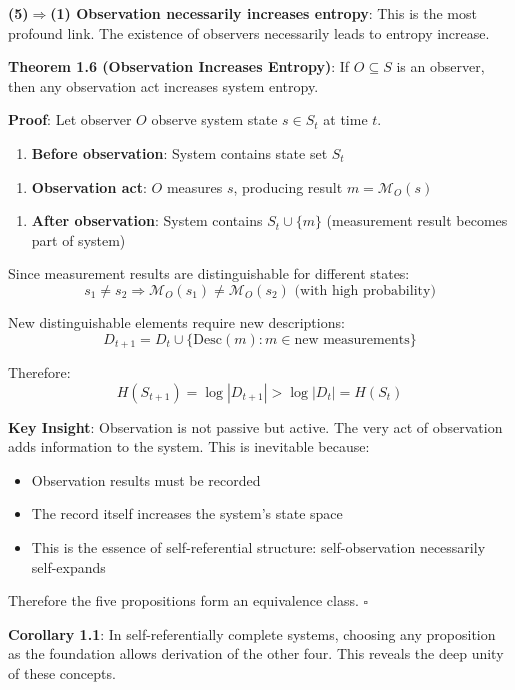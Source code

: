 \textbf{(5)$\Rightarrow$(1) Observation necessarily increases entropy}:
This is the most profound link. The existence of observers necessarily leads to entropy increase.

\textbf{Theorem 1.6 (Observation Increases Entropy)}:
\label{thm:1.6}
If $O \subseteq S$ is an observer, then any observation act increases system entropy.

\textbf{Proof}:
Let observer $O$ observe system state $s \in S_t$ at time $t$.

\begin{enumerate}
\item \textbf{Before observation}: System contains state set $S_t$
\end{enumerate}
\begin{enumerate}
\item \textbf{Observation act}: $O$ measures $s$, producing result $m = \mathcal{M}_O(s)$
\end{enumerate}
\begin{enumerate}
\item \textbf{After observation}: System contains $S_t \cup \{m\}$ (measurement result becomes part of system)
\end{enumerate}

Since measurement results are distinguishable for different states:
\begin{equation}
s_1 \neq s_2 \Rightarrow \mathcal{M}_O(s_1) \neq \mathcal{M}_O(s_2) \text{ (with high probability)}
\end{equation}

New distinguishable elements require new descriptions:
\begin{equation}
D_{t+1} = D_t \cup \{\text{Desc}(m): m \in \text{new measurements}\}
\end{equation}

Therefore:
\begin{equation}
H(S_{t+1}) = \log |D_{t+1}| > \log |D_t| = H(S_t)
\end{equation}

\textbf{Key Insight}: Observation is not passive but active. The very act of observation adds information to the system. This is inevitable because:
\begin{itemize}
\item Observation results must be recorded
\item The record itself increases the system's state space
\item This is the essence of self-referential structure: self-observation necessarily self-expands
\end{itemize}

Therefore the five propositions form an equivalence class. $\square$

\textbf{Corollary 1.1}:
\label{cor:1.1}
In self-referentially complete systems, choosing any proposition as the foundation allows derivation of the other four. This reveals the deep unity of these concepts.